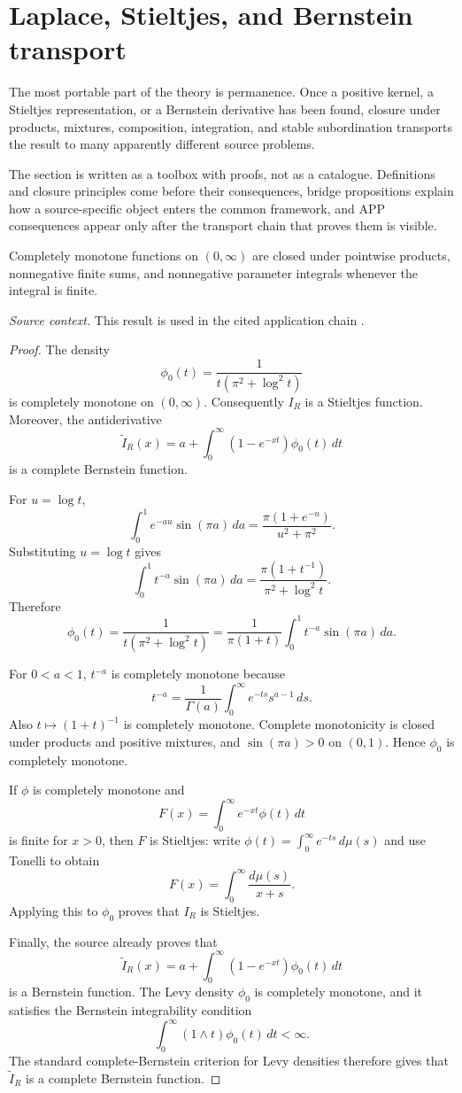 \section{Laplace, Stieltjes, and Bernstein transport}
The most portable part of the theory is permanence.  Once a positive kernel, a Stieltjes representation, or a Bernstein derivative has been found, closure under products, mixtures, composition, integration, and stable subordination transports the result to many apparently different source problems.

The section is written as a toolbox with proofs, not as a catalogue.  Definitions and closure principles come before their consequences, bridge propositions explain how a source-specific object enters the common framework, and APP consequences appear only after the transport chain that proves them is visible.
\begin{theorem}
\label{res:cm-closure-product-positive-mixture}
Completely monotone functions on \((0,\infty)\) are closed under pointwise products, nonnegative finite sums, and nonnegative parameter integrals whenever the integral is finite.

\emph{Source context.} This result is used in the cited application chain \cite{mishra-swaminathan-ramanujan}.
\end{theorem}
\begin{proof}
The density
\[
\phi_0(t)=\frac{1}{t(\pi^2+\log^2 t)}
\]
is completely monotone on \((0,\infty)\). Consequently \(I_R\) is a Stieltjes function. Moreover, the antiderivative
\[
\widetilde I_R(x)=a+\int_0^\infty (1-e^{-xt})\phi_0(t)\,dt
\]
is a complete Bernstein function.

For \(u=\log t\),
\[
\int_0^1 e^{-au}\sin(\pi a)\,da
=\frac{\pi(1+e^{-u})}{u^2+\pi^2}.
\]
Substituting \(u=\log t\) gives
\[
\int_0^1 t^{-a}\sin(\pi a)\,da
=\frac{\pi(1+t^{-1})}{\pi^2+\log^2 t}.
\]
Therefore
\[
\phi_0(t)
=\frac{1}{t(\pi^2+\log^2 t)}
=\frac{1}{\pi(1+t)}\int_0^1 t^{-a}\sin(\pi a)\,da.
\]

For \(0<a<1\), \(t^{-a}\) is completely monotone because
\[
t^{-a}=\frac1{\Gamma(a)}\int_0^\infty e^{-ts}s^{a-1}\,ds.
\]
Also \(t\mapsto(1+t)^{-1}\) is completely monotone. Complete monotonicity is closed under products and positive mixtures, and \(\sin(\pi a)>0\) on \((0,1)\). Hence \(\phi_0\) is completely monotone.

If \(\phi\) is completely monotone and
\[
F(x)=\int_0^\infty e^{-xt}\phi(t)\,dt
\]
is finite for \(x>0\), then \(F\) is Stieltjes: write \(\phi(t)=\int_0^\infty e^{-ts}\,d\mu(s)\) and use Tonelli to obtain
\[
F(x)=\int_0^\infty\frac{d\mu(s)}{x+s}.
\]
Applying this to \(\phi_0\) proves that \(I_R\) is Stieltjes.

Finally, the source already proves that
\[
\widetilde I_R(x)=a+\int_0^\infty (1-e^{-xt})\phi_0(t)\,dt
\]
is a Bernstein function. The Levy density \(\phi_0\) is completely monotone, and it satisfies the Bernstein integrability condition
\[
\int_0^\infty (1\wedge t)\phi_0(t)\,dt<\infty.
\]
The standard complete-Bernstein criterion for Levy densities therefore gives that \(\widetilde I_R\) is a complete Bernstein function.
\end{proof}

